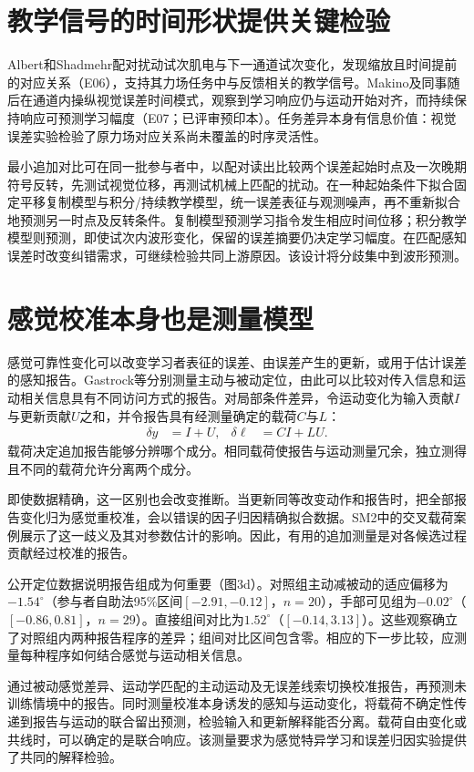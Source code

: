 \documentclass[11pt,a4paper]{article}
\begin{document}
\section{教学信号的时间形状提供关键检验}
Albert和Shadmehr配对扰动试次肌电与下一通道试次变化，发现缩放且时间提前的对应关系（E06），支持其力场任务中与反馈相关的教学信号。Makino及同事随后在通道内操纵视觉误差时间模式，观察到学习响应仍与运动开始对齐，而持续保持响应可预测学习幅度（E07；已评审预印本）。任务差异本身有信息价值：视觉误差实验检验了原力场对应关系尚未覆盖的时序灵活性。\cite{albert2016,makino2026}

最小追加对比可在同一批参与者中，以配对读出比较两个误差起始时点及一次晚期符号反转，先测试视觉位移，再测试机械上匹配的扰动。在一种起始条件下拟合固定平移复制模型与积分/持续教学模型，统一误差表征与观测噪声，再不重新拟合地预测另一时点及反转条件。复制模型预测学习指令发生相应时间位移；积分教学模型则预测，即使试次内波形变化，保留的误差摘要仍决定学习幅度。在匹配感知误差时改变纠错需求，可继续检验共同上游原因。该设计将分歧集中到波形预测。

\section{感觉校准本身也是测量模型}
感觉可靠性变化可以改变学习者表征的误差、由误差产生的更新，或用于估计误差的感知报告。Gastrock等分别测量主动与被动定位，由此可以比较对传入信息和运动相关信息具有不同访问方式的报告。对局部条件差异，令运动变化为输入贡献$I$与更新贡献$U$之和，并令报告具有经测量确定的载荷$C$与$L$：
\begin{align}\delta y&=I+U, &\delta\ell&=CI+LU.\label{eq:calibration}\end{align}
载荷决定追加报告能够分辨哪个成分。相同载荷使报告与运动测量冗余，独立测得且不同的载荷允许分离两个成分。\cite{external2020,hayashi2020}

即使数据精确，这一区别也会改变推断。当更新同等改变动作和报告时，把全部报告变化归为感觉重校准，会以错误的因子归因精确拟合数据。SM2中的交叉载荷案例展示了这一歧义及其对参数估计的影响。因此，有用的追加测量是对各候选过程贡献经过校准的报告。

公开定位数据说明报告组成为何重要（图3d）。对照组主动减被动的适应偏移为$-1.54^\circ$（参与者自助法95\%区间$[-2.91,-0.12]$，$n=20$），手部可见组为$-0.02^\circ$（$[-0.86,0.81]$，$n=29$）。直接组间对比为$1.52^\circ$（$[-0.14,3.13]$）。这些观察确立了对照组内两种报告程序的差异；组间对比区间包含零。相应的下一步比较，应测量每种程序如何结合感觉与运动相关信息。\cite{external2020}

通过被动感觉差异、运动学匹配的主动运动及无误差线索切换校准报告，再预测未训练情境中的报告。同时测量校准本身诱发的感知与运动变化，将载荷不确定性传递到报告与运动的联合留出预测，检验输入和更新解释能否分离。载荷自由变化或共线时，可以确定的是联合响应。该测量要求为感觉特异学习和误差归因实验提供了共同的解释检验。
\end{document}
